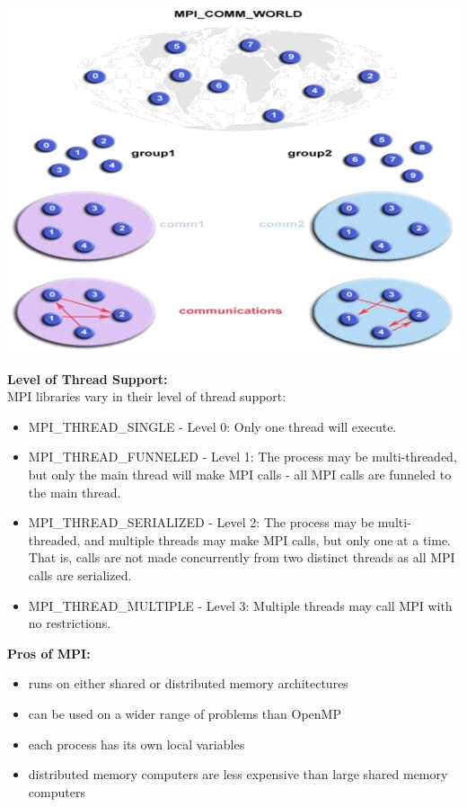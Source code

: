 \documentclass[10pt,a4paper]{article}
\begin{document}
\includegraphics{MPI_04.png}
\newpage

\textbf{Level of Thread Support:} \\ 
MPI libraries vary in their level of thread support: \\
\begin{itemize}
	\item	MPI\_THREAD\_SINGLE - Level 0: Only one thread will execute.  
	\item	MPI\_THREAD\_FUNNELED - Level 1: The process may be multi-threaded, but only the main thread will make MPI calls - all MPI calls are funneled to the main  thread.  
	\item	MPI\_THREAD\_SERIALIZED - Level 2: The process may be multi-threaded, and multiple threads may make MPI calls, but only one at a time. That is, calls are 
	not made concurrently from two distinct threads as all MPI calls are serialized.  
	\item	MPI\_THREAD\_MULTIPLE - Level 3: Multiple threads may call MPI with no restrictions.
\end{itemize}	 
  
\textbf{Pros of MPI:} 
\begin{itemize}
	\item  runs on either shared or distributed memory architectures 
	\item  can be used on a wider range of problems than OpenMP 
	\item  each process has its own local variables 
	\item distributed memory computers are less expensive than large shared memory computers 
\end{itemize} 
 
\end{document}
